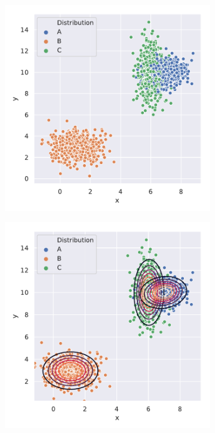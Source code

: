 \begin{figure}[tbp]
  \centering
  \begin{subfigure}[b]{0.49\textwidth}
    \includegraphics[width=\textwidth]{figures/clouds.pdf}
    \caption{\label{fig:gmm_cloud}}
  \end{subfigure}
  \begin{subfigure}[b]{0.49\textwidth}
    \includegraphics[width=\textwidth]{figures/gmm_dists.pdf}

\end{subfigure}
\end{figure}
